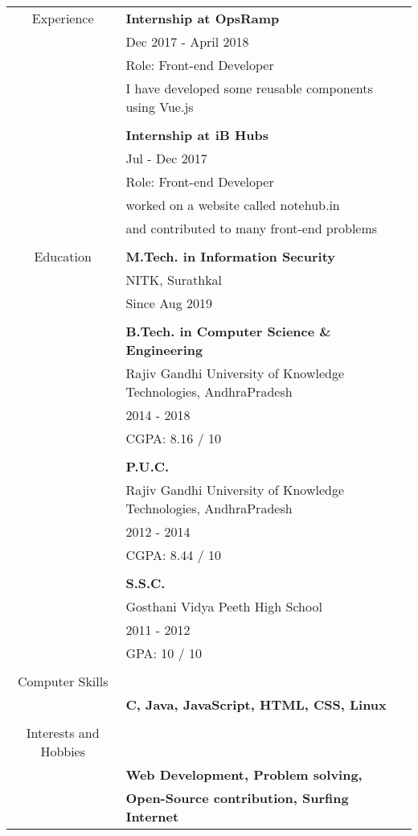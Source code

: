\documentclass[letterpaper,11pt,oneside]{article}
\begin{document}
\noindent \begin{tabular}{c l}

\Large{Experience} & \textbf{Internship at OpsRamp} \\
	& Dec 2017 - April 2018 \\
	& Role: Front-end Developer \\
	& I have developed some reusable components using Vue.js \\
	& \\
	& \textbf{Internship at iB Hubs} \\
	& Jul - Dec 2017 \\
	& Role: Front-end Developer \\
	& worked on a website called notehub.in \\
	& and contributed to many front-end problems\\
	& \\
\Large{Education} & \textbf{M.Tech. in Information Security} \\
	& NITK, Surathkal \\
	& Since Aug 2019 \\
	& \\
	& \textbf{B.Tech. in Computer Science \& Engineering} \\
	& Rajiv Gandhi University of Knowledge Technologies, AndhraPradesh \\
	& 2014 - 2018 \\
	& \textsc{CGPA:} 8.16 / 10 \\
	& \\
	& \textbf{P.U.C.} \\
	& Rajiv Gandhi University of Knowledge Technologies, AndhraPradesh \\
	& 2012 - 2014 \\
	&  \textsc{CGPA:} 8.44 / 10 \\
	& \\
	& \textbf{S.S.C.}\\
	& Gosthani Vidya Peeth High School \\
	& 2011 - 2012 \\
	& \textsc{GPA:} 10 / 10 \\
	& \\
\Large{Computer Skills} & \\
	& \bfseries{\textsc{C}, Java, JavaScript, \textsc{HTML}, \textsc{CSS}, Linux} \\
	& \\
\Large{Interests and Hobbies} & \\
	& \bfseries{Web Development, Problem solving,}\\
	& \bfseries{Open-Source contribution, Surfing Internet }\\

\end{tabular}
	
\end{document}
